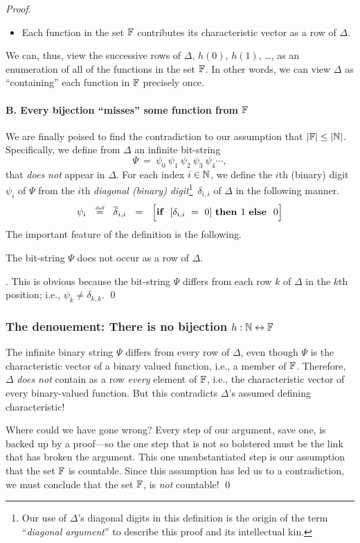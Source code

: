 \begin{proof}
\begin{itemize}
\medskip\item
Each function in the set $\mathbb{F}$ contributes its characteristic vector as a row of $\Delta$.
\end{itemize}
We can, thus, view the successive rows of $\Delta$, $h(0)$, $h(1)$, \ldots, as an enumeration of all of the functions in the set $\mathbb{F}$.  In other words, we can view $\Delta$ as ``containing'' each function in $\mathbb{F}$ precisely once.

\paragraph{B. Every bijection ``misses'' some function from $\mathbb{F}$}

We are finally poised to find the contradiction to our assumption that $|\mathbb{F}| \leq |\mathbb{N}|$.  Specifically, we define from $\Delta$ an infinite bit-string
\[ \Psi \ = \ \psi_0 \ \psi_1 \ \psi_2 \ \psi_3 \ \psi_4 \cdots, \]
that {\em does not} appear in $\Delta$.  For each index $i \in \mathbb{N}$, we define the $i$th (binary) digit $\psi_i$ of $\Psi$ from the $i$th {\em diagonal (binary) digit}\footnote{Our use of $\Delta$'s diagonal digits in this definition is the origin of the term ``{\em diagonal argument}'' to describe this proof and its intellectual kin.}~$\delta_{i,i}$ of $\Delta$ in the following manner.
\[ \psi_i \ \ \eqdef \ \ \overline{\delta}_{i,i} \ \ = \ \
\Big[\mbox{\bf if } \ [\delta_{i,i} \ = \ 0] \ \mbox{\bf then } 1 \ \mbox{\bf else } \ 0 \Big]
\]
The important feature of the definition is the following.

\begin{lemma}
\label{lem:PSI-notin-DELTA}
The bit-string $\Psi$ does not occur as a row of $\Delta$.
\end{lemma}

.
This is obvious because the bit-string $\Psi$ differs from each row $k$ of $\Delta$ in the $k$th position; i.e., $\psi_k \neq \delta_{k,k}$.  \qed

\subsubsection{The denouement: There is no bijection  $h: \mathbb{N} \leftrightarrow \mathbb{F}$}

The infinite binary string $\Psi$ differs from every row of $\Delta$, even though $\Psi$ is the characteristic vector of a binary valued function, i.e., a member of $\mathbb{F}$.  Therefore, $\Delta$ {\em does not} contain as a row {\em every} element of $\mathbb{F}$, i.e., the characteristic vector of every binary-valued function.  But this contradicts $\Delta$'s assumed defining characteristic!

\smallskip

Where could we have gone wrong?  Every step of our argument, save one, is backed up by a proof---so the one step that is not so bolstered must be the link that has broken the argument.  This one unsubstantiated step is our assumption that the set $\mathbb{F}$ is countable. Since this assumption has led us to a contradiction, we must conclude that the set $\mathbb{F}$, is {\em not} countable!  \qed
\end{proof}

